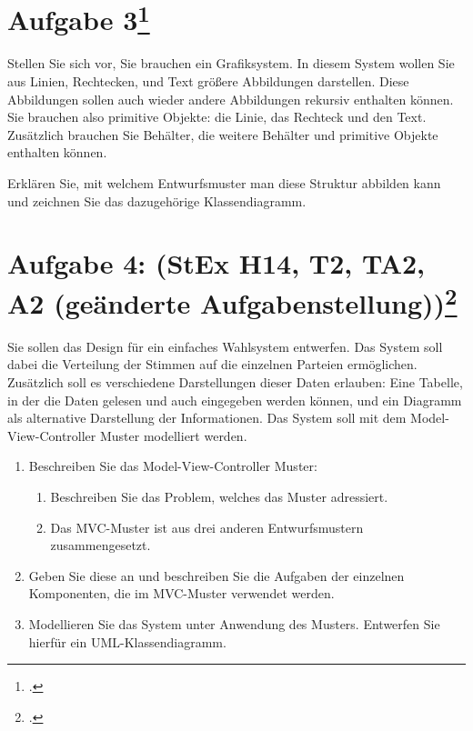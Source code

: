\documentclass{lehramt-informatik}
\begin{document}
%

\section{Aufgabe 3\footcite{sosy:ab:6}}

Stellen Sie sich vor, Sie brauchen ein Grafiksystem. In diesem System
wollen Sie aus Linien, Rechtecken, und Text größere Abbildungen
darstellen. Diese Abbildungen sollen auch wieder andere Abbildungen
rekursiv enthalten können. Sie brauchen also primitive Objekte: die
Linie, das Rechteck und den Text. Zusätzlich brauchen Sie Behälter, die
weitere Behälter und primitive Objekte enthalten können.

Erklären Sie, mit welchem Entwurfsmuster man diese Struktur abbilden
kann und zeichnen Sie das dazugehörige Klassendiagramm.

%

\section{Aufgabe 4: (StEx H14, T2, TA2, A2 (geänderte Aufgabenstellung))\footcite{sosy:ab:6}}

Sie sollen das Design für ein einfaches Wahlsystem entwerfen. Das System
soll dabei die Verteilung der Stimmen auf die einzelnen Parteien
ermöglichen. Zusätzlich soll es verschiedene Darstellungen dieser Daten
erlauben: Eine Tabelle, in der die Daten gelesen und auch eingegeben
werden können, und ein Diagramm als alternative Darstellung der
Informationen. Das System soll mit dem Model-View-Controller Muster
modelliert werden.

\begin{enumerate}


\item Beschreiben Sie das Model-View-Controller Muster:

\begin{enumerate}


\item Beschreiben Sie das Problem, welches das Muster adressiert.


\item Das MVC-Muster ist aus drei anderen Entwurfsmustern
zusammengesetzt.
\end{enumerate}

\item Geben Sie diese an und beschreiben Sie die Aufgaben der einzelnen
Komponenten, die im MVC-Muster verwendet werden.


\item Modellieren Sie das System unter Anwendung des Musters. Entwerfen
Sie hierfür ein UML-Klassendiagramm.

\end{enumerate}

\literatur
\end{document}
